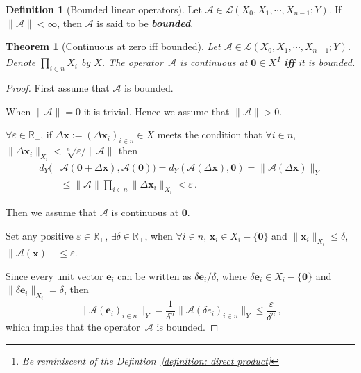 \documentclass[openany]{book}
\newcommand*{\indexbf}[1]{\emph{\textbf{#1}}\index{#1}} %
\theoremstyle{plain}
\newtheorem{theorem}{Theorem}[section] %
\theoremstyle{definition}
\newtheorem{definition}{Definition}[section] %
\newcommand*{\bv}{\boldsymbol} %
\newcommand{\emphbf}[1]{\emph{\textbf{#1}}}
\begin{document}
\begin{definition}[Bounded linear operators]
	Let $\mathscr A \in \mathcal L(X_0, X_1, \cdots, X_{n - 1}; Y)$. 
	If $\|\mathscr A\| < \infty$, then $\mathscr A$ is said to be \indexbf{bounded}.
\end{definition}

\begin{theorem}[Continuous at zero iff bounded]\label{theorem: continuous at zero iff bounded}
	Let $\mathscr A \in \mathcal L(X_0, X_1, \cdots, X_{n - 1}; Y)$.
	Denote $\prod_{i \in n} X_i$ by $X$.
	The operator~$\mathscr A$ is continuous at $\bv 0 \in X$\footnote{Be reminiscent of the Defintion~\ref{definition: direct product}} \emphbf{iff} it is bounded.
\end{theorem}
\begin{proof}
	First assume that $\mathscr A$ is bounded. 

	When $\|\mathscr A\| = 0$ it is trivial. 
	Hence we assume that $\|\mathscr A\| > 0$.
	
	$\forall \varepsilon \in \mathbb R_+$, if $\Delta \bv x := (\Delta \bv x_i)_{i \in n} \in X$ meets the condition that $\forall i \in n$, $\|\Delta \bv x_i\|_{X_i} < \sqrt[n]{\varepsilon / \|\mathscr A\|}$ then
	\begin{align*}
		d_Y(&\mathscr A(\bv 0 + \Delta \bv x), \mathscr A(\bv 0))
		= d_Y(\mathscr A(\Delta \bv x), \bv 0)
		= \|\mathscr A(\Delta \bv x)\|_Y
		\\
		&\leq \|\mathscr A\| \prod_{i \in n} \|\Delta \bv x_i\|_{X_i}
		< \varepsilon \,.
	\end{align*}

	Then we assume that $\mathscr A$ is continuous at $\bv 0$.

	Set any positive $\varepsilon \in \mathbb R_+$, $\exists \delta \in \mathbb R_+$, when $\forall i \in n$, $\bv x_i \in X_i - \{\bv 0\}$ and $\|\bv x_i\|_{X_i} \leq \delta$, $\|\mathscr A(\bv x)\| \leq \varepsilon$. 

	Since every unit vector $\bv e_i$ can be written as $\delta \bv e_i / \delta$, where $\delta \bv e_i \in X_i - \{\bv 0\}$ and $\|\delta \bv e_i\|_{X_i} = \delta$, then
	\begin{equation*}
		\|\mathscr A(\bv e_i)_{i \in n}\|_Y 
		= \frac 1 {\delta^n} \|\mathscr A(\delta e_i)_{i \in n}\|_Y
		\leq \frac \varepsilon {\delta^n}\,,
	\end{equation*}
	which implies that the operator~$\mathscr A$ is bounded.
\end{proof}
\end{document}
